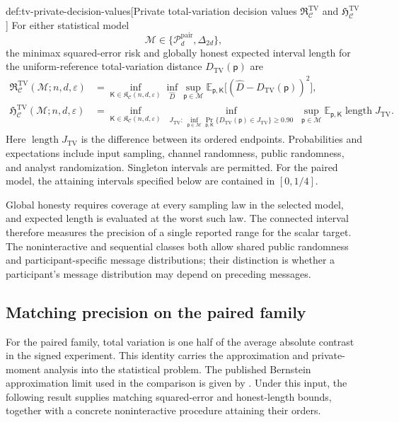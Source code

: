 \begin{definitionv}{def:tv-private-decision-values}[Private total-variation decision values $\mathfrak R^{\mathrm{TV}}_{\mathcal C}$ and $\mathfrak H^{\mathrm{TV}}_{\mathcal C}$]
For either statistical model
\[
\mathcal M\in\{\mathcal P_d^{\mathrm{pair}},\Delta_{2d}\},
\]
the minimax squared-error risk and globally honest expected interval length for the uniform-reference total-variation distance \(D_{\mathrm{TV}}(\mathsf p)\) are
\[
\begin{aligned}
\mathfrak R^{\mathrm{TV}}_{\mathcal C}(\mathcal M;n,d,\varepsilon)
&=
\inf_{\mathsf K\in\mathfrak K_{\mathcal C}(n,d,\varepsilon)}
\inf_{\widehat D}
\sup_{\mathsf p\in\mathcal M}
\mathbb E_{\mathsf p,\mathsf K}
\bigl[(\widehat D-D_{\mathrm{TV}}(\mathsf p))^2\bigr],\\
\mathfrak H^{\mathrm{TV}}_{\mathcal C}(\mathcal M;n,d,\varepsilon)
&=
\inf_{\mathsf K\in\mathfrak K_{\mathcal C}(n,d,\varepsilon)}
\inf_{\substack{J_{\mathrm{TV}}:\,
\inf_{\mathsf p\in\mathcal M}
\Pr_{\mathsf p,\mathsf K}
\{D_{\mathrm{TV}}(\mathsf p)\in J_{\mathrm{TV}}\}\ge0.90}}
\sup_{\mathsf p\in\mathcal M}
\mathbb E_{\mathsf p,\mathsf K}
\operatorname{length}J_{\mathrm{TV}}.
\end{aligned}
\]
Here \(\operatorname{length}J_{\mathrm{TV}}\) is the difference between its ordered endpoints. Probabilities and expectations include input sampling, channel randomness, public randomness, and analyst randomization. Singleton intervals are permitted. For the paired model, the attaining intervals specified below are contained in \([0,1/4]\).
\end{definitionv}

Global honesty requires coverage at every sampling law in the selected model, and expected length is evaluated at the worst such law. The connected interval  therefore measures the precision of a single reported range for the scalar target. The noninteractive and sequential classes both allow shared public randomness and participant-specific message distributions; their distinction is whether a participant's message distribution may depend on preceding messages.

\subsection{Matching precision on the paired family}

For the paired family, total variation is one half of the average absolute contrast in the signed experiment. This identity carries the approximation and private-moment analysis into the statistical problem. The published Bernstein approximation limit used in the comparison is given by \citet[Section 3.1, p.~8]{CaiLow2011Nonsmooth}. Under this input, the following result supplies matching squared-error and honest-length bounds, together with a concrete noninteractive procedure attaining their orders.

